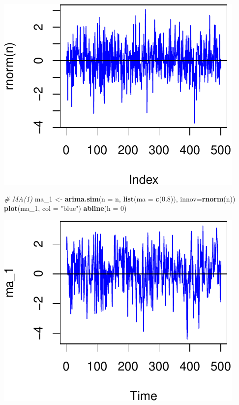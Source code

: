 \documentclass[11pt,]{article}
\newenvironment{Shaded}{\begin{snugshade}}{\end{snugshade}}
\newcommand{\KeywordTok}[1]{\textcolor[rgb]{0.13,0.29,0.53}{\textbf{#1}}}
\newcommand{\DataTypeTok}[1]{\textcolor[rgb]{0.13,0.29,0.53}{#1}}
\newcommand{\DecValTok}[1]{\textcolor[rgb]{0.00,0.00,0.81}{#1}}
\newcommand{\FloatTok}[1]{\textcolor[rgb]{0.00,0.00,0.81}{#1}}
\newcommand{\StringTok}[1]{\textcolor[rgb]{0.31,0.60,0.02}{#1}}
\newcommand{\CommentTok}[1]{\textcolor[rgb]{0.56,0.35,0.01}{\textit{#1}}}
\newcommand{\NormalTok}[1]{#1}
\begin{document}
\begin{center}\includegraphics{FMC_T4_PhD_ARMA_GARCH_files/figure-latex/MA-1} \end{center}

\begin{Shaded}
\begin{Highlighting}[]
\CommentTok{# MA(1)}
\NormalTok{ma_}\DecValTok{1}\NormalTok{ <-}\StringTok{ }\KeywordTok{arima.sim}\NormalTok{(}\DataTypeTok{n =}\NormalTok{ n, }\KeywordTok{list}\NormalTok{(}\DataTypeTok{ma =} \KeywordTok{c}\NormalTok{(}\FloatTok{0.8}\NormalTok{)), }\DataTypeTok{innov=}\KeywordTok{rnorm}\NormalTok{(n))}
\KeywordTok{plot}\NormalTok{(ma_}\DecValTok{1}\NormalTok{, }\DataTypeTok{col =} \StringTok{"blue"}\NormalTok{)}
\KeywordTok{abline}\NormalTok{(}\DataTypeTok{h =} \DecValTok{0}\NormalTok{)}
\end{Highlighting}
\end{Shaded}

\begin{center}\includegraphics{FMC_T4_PhD_ARMA_GARCH_files/figure-latex/MA-2} \end{center}
\end{document}

